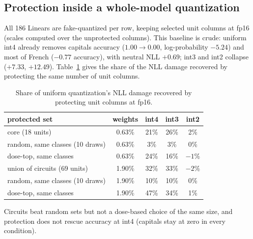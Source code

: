 \documentclass[11pt]{article}
\begin{document}
\subsection{Protection inside a whole-model quantization}
All 186 Linears are fake-quantized per row, keeping selected unit columns at fp16 (scales computed over the unprotected columns). This baseline is crude: uniform int4 already removes capitals accuracy
($1.00\to0.00$, log-probability $-5.24$) and most of French ($-0.77$ accuracy), with neutral NLL $+0.69$; int3 and int2 collapse ($+7.33$, $+12.49$).
Table~\ref{tab:protect} gives the share of the NLL damage recovered by protecting the same number of unit columns.
\begin{table}[h]
\centering\small
\begin{tabular}{lcccc}
\toprule
protected set & weights & int4 & int3 & int2\\
\midrule
core (18 units) & 0.63\% & 21\% & 26\% & 2\%\\
random, same classes (10 draws) & 0.63\% & 3\% & 3\% & 0\%\\
dose-top, same classes & 0.63\% & 24\% & 16\% & $-1$\%\\
union of circuits (69 units) & 1.90\% & 32\% & 33\% & $-2$\%\\
random, same classes (10 draws) & 1.90\% & 10\% & 10\% & 0\%\\
dose-top, same classes & 1.90\% & 47\% & 34\% & 1\%\\
\bottomrule
\end{tabular}
\caption{Share of uniform quantization's NLL damage recovered by protecting unit columns at fp16.}
\label{tab:protect}
\end{table}
Circuits beat random sets but not a dose-based choice of the same size, and protection does not rescue accuracy at int4 (capitals stay at zero in every condition).
\end{document}
